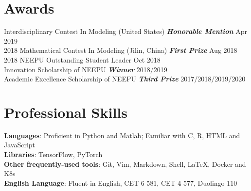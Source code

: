 \documentclass{my_cv}
\begin{document}
\section{Awards}
 Interdisciplinary Contest In Modeling (United States) \textbf{\emph{Honorable Mention}} \hfill Apr 2019\\
2018 Mathematical Contest In Modeling (Jilin, China) \textbf{\emph{First Prize}} \hfill Aug 2018\\
2018 NEEPU Outstanding Student Leader \hfill Oct 2018\\
Innovation Scholarship of NEEPU \textbf{\emph{Winner}} \hfill 2018/2019\\
Academic Excellence Scholarship of NEEPU \textbf{\emph{Third Prize}} \hfill 2017/2018/2019/2020

\hspace*{\fill}

\section{Professional Skills}
\noindent \textbf{Languages}: Proficient in Python and Matlab; Familiar with C, R, HTML and JavaScript \\
\textbf{Libraries}: TensorFlow, PyTorch \\
\textbf{Other frequently-used tools}: Git, Vim, Markdown, Shell, \LaTeX, Docker and K8s \\
\textbf{English Language}: Fluent in English, CET-6 581, CET-4 577, Duolingo 110
\end{document}
